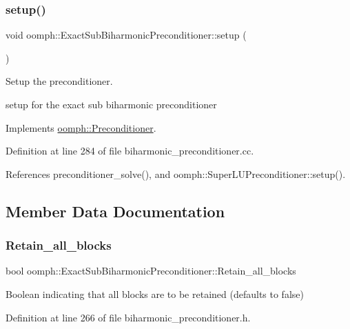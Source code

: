 \subsubsection{\texorpdfstring{setup()}{setup()}}
{\footnotesize\ttfamily void oomph\+::\+Exact\+Sub\+Biharmonic\+Preconditioner\+::setup (\begin{DoxyParamCaption}{ }\end{DoxyParamCaption})\hspace{0.3cm}{\ttfamily [virtual]}}



Setup the preconditioner. 

setup for the exact sub biharmonic preconditioner 

Implements \hyperlink{classoomph_1_1Preconditioner_af4886f4efe510e5c9b0eb19422943588}{oomph\+::\+Preconditioner}.



Definition at line 284 of file biharmonic\+\_\+preconditioner.\+cc.



References preconditioner\+\_\+solve(), and oomph\+::\+Super\+L\+U\+Preconditioner\+::setup().



\subsection{Member Data Documentation}
\mbox{\label{classoomph_1_1ExactSubBiharmonicPreconditioner_aa70a47f3675b510ae74ae11b86648f93}} 
\subsubsection{\texorpdfstring{Retain\+\_\+all\+\_\+blocks}{Retain\_all\_blocks}}
{\footnotesize\ttfamily bool oomph\+::\+Exact\+Sub\+Biharmonic\+Preconditioner\+::\+Retain\+\_\+all\+\_\+blocks}



Boolean indicating that all blocks are to be retained (defaults to false) 



Definition at line 266 of file biharmonic\+\_\+preconditioner.\+h.

